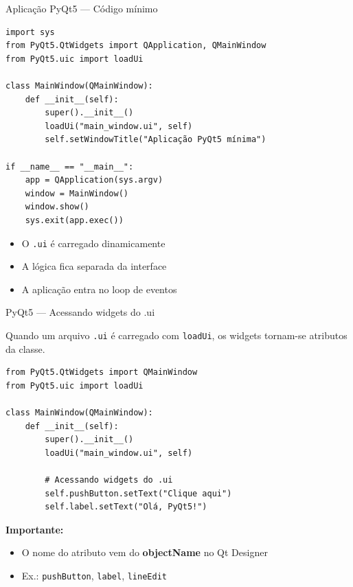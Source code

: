 \documentclass{beamer}
\begin{document}
    \begin{frame}[fragile]{Aplicação PyQt5 — Código mínimo}
        
        \begin{verbatim}
import sys
from PyQt5.QtWidgets import QApplication, QMainWindow
from PyQt5.uic import loadUi

class MainWindow(QMainWindow):
    def __init__(self):
        super().__init__()
        loadUi("main_window.ui", self)
        self.setWindowTitle("Aplicação PyQt5 mínima")

if __name__ == "__main__":
    app = QApplication(sys.argv)
    window = MainWindow()
    window.show()
    sys.exit(app.exec())
        \end{verbatim}
        
        \begin{itemize}
            \item O \texttt{.ui} é carregado dinamicamente
            \item A lógica fica separada da interface
            \item A aplicação entra no loop de eventos
        \end{itemize}
        
    \end{frame}
    
    \begin{frame}[fragile]{PyQt5 — Acessando widgets do .ui}
        
        Quando um arquivo \texttt{.ui} é carregado com \texttt{loadUi},  
        os widgets tornam-se atributos da classe.
        
        \vspace{0.3cm}
        
        \begin{verbatim}
from PyQt5.QtWidgets import QMainWindow
from PyQt5.uic import loadUi

class MainWindow(QMainWindow):
    def __init__(self):
        super().__init__()
        loadUi("main_window.ui", self)

        # Acessando widgets do .ui
        self.pushButton.setText("Clique aqui")
        self.label.setText("Olá, PyQt5!")
        \end{verbatim}
        
        \vspace{0.3cm}
        
        \textbf{Importante:}
        \begin{itemize}
            \item O nome do atributo vem do \textbf{objectName} no Qt Designer
            \item Ex.: \texttt{pushButton}, \texttt{label}, \texttt{lineEdit}
        \end{itemize}
        
    \end{frame}
    
\end{document}
